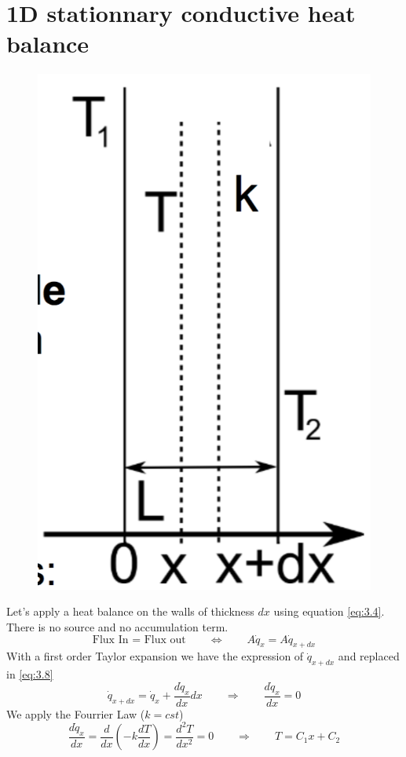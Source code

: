 	 	\section{1D stationnary conductive heat balance}
	 		\begin{figure}
 			\vspace{-5mm}
 			\includegraphics[scale=0.2]{ch3/5}
 			\end{figure}
 			Let's apply a heat balance on the walls of thickness $dx$ using equation \autoref{eq:3.4}. There is no source and no accumulation term. 
 			\begin{equation}
 				\mbox{Flux In = Flux out} \qquad \Leftrightarrow \qquad A\dot{q}_x = A\dot{q}_{x+dx}
 				\label{eq:3.8}
 			\end{equation}
 			With a first order Taylor expansion we have the expression of $\dot{q}_{x+dx}$ and replaced in \autoref{eq:3.8}
 			\begin{equation}
 				\dot{q}_{x+dx} = \dot{q}_x + \frac{d\dot{q}_x}{dx}dx \qquad \Rightarrow \qquad \frac{d\dot{q}_x}{dx} = 0
 			\end{equation}
 			We apply the Fourrier Law ($k =cst$)
 			\begin{equation}
 				\frac{d\dot{q}_x}{dx} = \frac{d}{dx}\left(- k\frac{dT}{dx} \right) = \frac{d^2T}{dx^2} = 0 \qquad \Rightarrow \qquad T = C_1 x + C_2
 			\end{equation}
